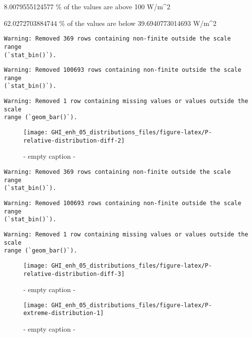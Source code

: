 \documentclass[
  10pt,
  a4paper,oneside]{article}
\begin{document}
8.0079555124577 \% of the values are above 100 W/m\^{}2

62.0272703884744 \% of the values are below 39.6940773014693 W/m\^{}2

\begin{verbatim}
Warning: Removed 369 rows containing non-finite outside the scale range
(`stat_bin()`).
\end{verbatim}

\begin{verbatim}
Warning: Removed 100693 rows containing non-finite outside the scale range
(`stat_bin()`).
\end{verbatim}

\begin{verbatim}
Warning: Removed 1 row containing missing values or values outside the scale
range (`geom_bar()`).
\end{verbatim}

\begin{figure}[H]

{\centering \texttt{[image: GHI\_enh\_05\_distributions\_files/figure-latex/P-relative-distribution-diff-2]} 

}

\caption{ - empty caption - }\label{fig:P-relative-distribution-diff-2}
\end{figure}

\begin{verbatim}
Warning: Removed 369 rows containing non-finite outside the scale range
(`stat_bin()`).
\end{verbatim}

\begin{verbatim}
Warning: Removed 100693 rows containing non-finite outside the scale range
(`stat_bin()`).
\end{verbatim}

\begin{verbatim}
Warning: Removed 1 row containing missing values or values outside the scale
range (`geom_bar()`).
\end{verbatim}

\begin{figure}[H]

{\centering \texttt{[image: GHI\_enh\_05\_distributions\_files/figure-latex/P-relative-distribution-diff-3]} 

}

\caption{ - empty caption - }\label{fig:P-relative-distribution-diff-3}
\end{figure}
\begin{figure}[H]

{\centering \texttt{[image: GHI\_enh\_05\_distributions\_files/figure-latex/P-extreme-distribution-1]} 

}

\caption{ - empty caption - }\label{fig:P-extreme-distribution-1}
\end{figure}
\end{document}
